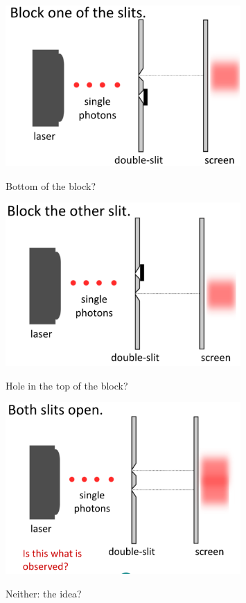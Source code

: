 \begin{figure}[H]
   \centering
    \includegraphics[width=0.8\textwidth]{lesson6/block_bottom.pdf}
    \label{fig: 1}
    
        \caption{Bottom of the block?}
    
\end{figure}

\begin{figure}[H]
   \centering
    \includegraphics[width=0.8\textwidth]{lesson6/block_top.pdf}
    \label{fig: 1}
    
        \caption{Hole in the top of the block?}
    
\end{figure}

\begin{figure}[H]
   \centering
    \includegraphics[width=0.8\textwidth]{lesson6/block_neither.pdf}
    \label{fig: 1}
    
        \caption{Neither: the idea?}
    
\end{figure}

